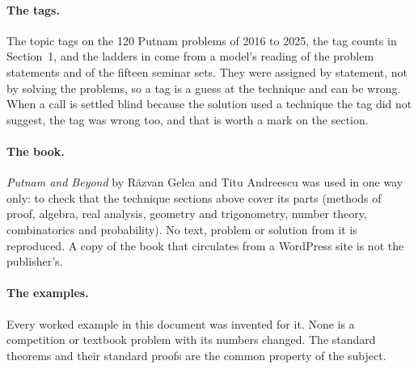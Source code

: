 \paragraph{The tags.} The topic tags on the 120 Putnam problems of 2016 to 2025, the tag counts in Section~1, and the ladders in  come from a model's reading of the problem statements and of the fifteen seminar sets. They were assigned by statement, not by solving the problems, so a tag is a guess at the technique and can be wrong. When a call is settled blind because the solution used a technique the tag did not suggest, the tag was wrong too, and that is worth a mark on the section.

\paragraph{The book.} \emph{Putnam and Beyond} by R\u{a}zvan Gelca and Titu Andreescu was used in one way only: to check that the technique sections above cover its parts (methods of proof, algebra, real analysis, geometry and trigonometry, number theory, combinatorics and probability). No text, problem or solution from it is reproduced. A copy of the book that circulates from a WordPress site is not the publisher's.

\paragraph{The examples.} Every worked example in this document was invented for it. None is a competition or textbook problem with its numbers changed. The standard theorems and their standard proofs are the common property of the subject.

